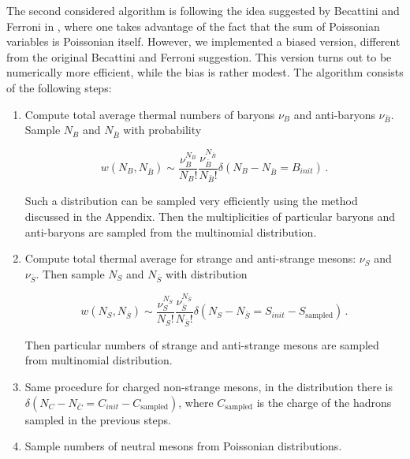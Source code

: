 The second considered algorithm is following the idea suggested by Becattini
and Ferroni in \cite{Becattini:2004rq}, where one takes advantage of the fact
that the sum of Poissonian variables is Poissonian itself. However, we
implemented a biased version, different from the original Becattini and Ferroni
suggestion. This version turns out to be numerically more efficient, while the
bias is rather modest. The algorithm consists of the following steps:

\begin{enumerate}
  \item Compute total average thermal numbers of baryons $\nu_{B}$ and
        anti-baryons $\nu_{\bar{B}}$. Sample $N_B$ and $N_{\bar{B}}$ with probability

    \begin{equation}
      w(N_B, N_{\bar{B}}) \sim \frac{\nu_{B}^{N_B}}{N_B!}
      \frac{\nu_{\bar{B}}^{N_{\bar{B}}}}{N_{\bar{B}}!} \delta(N_B - N_{\bar{B}} = B_{init}) \,.
    \end{equation}

        Such a distribution can be sampled very efficiently using the method discussed
        in the Appendix. Then the multiplicities of particular baryons and anti-baryons
        are sampled from the multinomial distribution.
  \item Compute total thermal average  for strange and anti-strange mesons:
        $\nu_{S}$ and $\nu_{\bar{S}}$. Then sample $N_S$ and $N_{\bar{S}}$ with distribution

    \begin{equation}
      w(N_S, N_{\bar{S}}) \sim \frac{\nu_{S}^{N_S}}{N_S!}
      \frac{\nu_{\bar{S}}^{N_{\bar{S}}}}{N_{\bar{S}}!}
      \delta(N_S - N_{\bar{S}} = S_{init} - S_{\mathrm{sampled}}) \,.
    \end{equation}

        Then particular numbers of strange and anti-strange mesons are sampled from
        multinomial distribution.
  \item Same procedure for charged non-strange mesons, in the distribution
        there is $\delta(N_C - N_{\bar{C}} = C_{init} - C_{\mathrm{sampled}})$, where
        $C_{\mathrm{sampled}}$ is the charge of the hadrons sampled in the previous
        steps.
  \item Sample numbers of neutral mesons from Poissonian distributions.
\end{enumerate}

